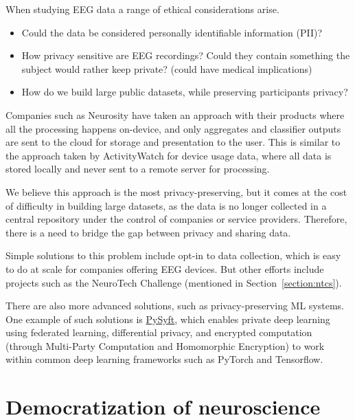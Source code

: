     When studying EEG data a range of ethical considerations arise. 

    \begin{itemize}
        \item Could the data be considered personally identifiable information (PII)? 
        \item How privacy sensitive are EEG recordings? Could they contain something the subject would rather keep private? (could have medical implications)
        \item How do we build large public datasets, while preserving participants privacy?
    \end{itemize}

    Companies such as Neurosity have taken an approach with their products where all the processing happens on-device, and only aggregates and classifier outputs are sent to the cloud for storage and presentation to the user. This is similar to the approach taken by ActivityWatch for device usage data, where all data is stored locally and never sent to a remote server for processing. 

    We believe this approach is the most privacy-preserving, but it comes at the cost of difficulty in building large datasets, as the data is no longer collected in a central repository under the control of companies or service providers. Therefore, there is a need to bridge the gap between privacy and sharing data.

    Simple solutions to this problem include opt-in to data collection, which is easy to do at scale for companies offering EEG devices. But other efforts include projects such as the NeuroTech Challenge (mentioned in Section~\ref{section:ntcs}).

    There are also more advanced solutions, such as privacy-preserving ML systems. One example of such solutions is \href{https://github.com/OpenMined/PySyft}{PySyft}, which enables private deep learning using federated learning, differential privacy, and encrypted computation (through Multi-Party Computation and Homomorphic Encryption) to work within common deep learning frameworks such as PyTorch and Tensorflow.

\section{Democratization of neuroscience}

